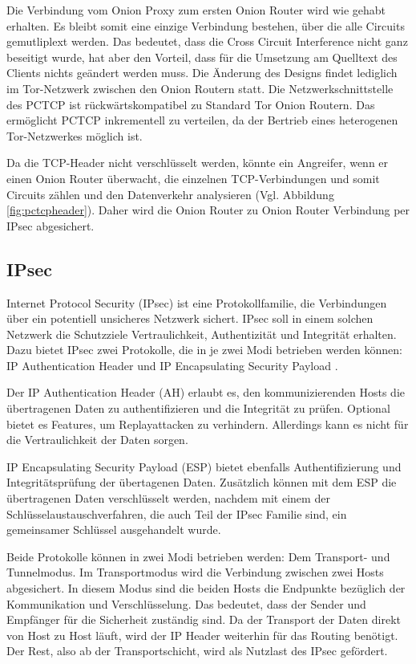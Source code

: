 \documentclass[fleqn,envcountsame,runningheads,10pt,a4paper]{llncs}
\begin{document}
Die Verbindung vom Onion Proxy zum ersten Onion Router wird wie gehabt erhalten. 
Es bleibt somit eine einzige Verbindung bestehen, über die alle Circuits 
gemutliplext werden. Das bedeutet, dass die Cross Circuit Interference nicht 
ganz beseitigt wurde, hat aber den Vorteil, dass für die Umsetzung am Quelltext 
des Clients nichts geändert werden muss. Die Änderung des Designs findet 
lediglich im Tor-Netzwerk zwischen den Onion Routern statt. Die 
Netzwerkschnittstelle des PCTCP ist rückwärtskompatibel zu Standard Tor Onion 
Routern. Das ermöglicht PCTCP inkrementell zu verteilen, da der Bertrieb eines 
heterogenen Tor-Netzwerkes möglich ist.

Da die TCP-Header nicht verschlüsselt werden, könnte ein Angreifer, wenn er 
einen Onion Router überwacht, die einzelnen TCP-Ver\-bin\-dung\-en und somit 
Circuits zählen und den Datenverkehr analysieren (Vgl. Abbildung 
\ref{fig:pctcpheader}). Daher wird die Onion Router zu Onion Router Verbindung 
per IPsec abgesichert.

\subsection{IPsec}

Internet Protocol Security (IPsec) ist eine Protokollfamilie, die Verbindungen 
über ein potentiell unsicheres Netzwerk sichert. IPsec soll in einem solchen 
Netzwerk die Schutzziele Vertraulichkeit, Authentizität und Integrität erhalten. 
Dazu bietet IPsec zwei Protokolle, die in je zwei Modi betrieben werden können: 
IP Authentication Header \cite{rfc:ah} und IP Encapsulating Security Payload 
\cite{rfc:esp}.

Der IP Authentication Header (AH) erlaubt es, den kommunizierenden Hosts die 
übertragenen Daten zu authentifizieren und die Integrität zu prüfen. Optional 
bietet es Features, um Replayattacken zu verhindern. Allerdings kann es nicht 
für die Vertraulichkeit der Daten sorgen.

IP Encapsulating Security Payload (ESP) bietet ebenfalls Authentifizierung und 
In\-te\-gri\-täts\-prü\-fung der übertagenen Daten. Zusätzlich können mit dem 
ESP die übertragenen Daten verschlüsselt werden, nachdem mit einem der 
Schlüsselaustauschverfahren, die auch Teil der IPsec Familie sind, ein 
gemeinsamer Schlüssel ausgehandelt wurde. 

Beide Protokolle können in zwei Modi betrieben werden: Dem Transport- und 
Tunnelmodus. Im Transportmodus wird die Verbindung zwischen zwei Hosts 
abgesichert. In diesem Modus sind die beiden Hosts die Endpunkte bezüglich der 
Kommunikation und Verschlüsselung. Das bedeutet, dass der Sender und Empfänger 
für die Sicherheit zuständig sind. Da der Transport der Daten direkt von Host zu 
Host läuft, wird der IP Header weiterhin für das Routing benötigt. Der Rest, 
also ab der Transportschicht, wird als Nutzlast des IPsec gefördert.
\end{document}
